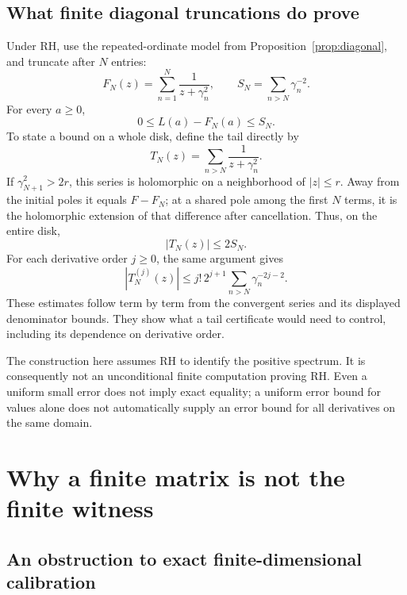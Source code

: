 \documentclass[11pt,a4paper]{article}
\numberwithin{equation}{section}
\theoremstyle{definition}
\theoremstyle{remark}
\begin{document}
\subsection{What finite diagonal truncations do prove}

Under RH, use the repeated-ordinate model from
Proposition~\ref{prop:diagonal}, and truncate after $N$ entries:
\[
F_N(z)=\sum_{n=1}^N\frac1{z+\gamma_n^2},\qquad
S_N=\sum_{n>N}\gamma_n^{-2}.
\]
For every $a\geq0$,
\begin{equation}\label{eq:positive-tail}
0\leq L(a)-F_N(a)\leq S_N.
\end{equation}
To state a bound on a whole disk, define the tail directly by
\[
T_N(z)=\sum_{n>N}\frac1{z+\gamma_n^2}.
\]
If $\gamma_{N+1}^2>2r$, this series is holomorphic on a neighborhood
of $|z|\leq r$. Away from the initial poles it equals $F-F_N$;
at a shared pole among the first $N$ terms, it is the holomorphic
extension of that difference after cancellation. Thus, on the entire disk,
\begin{equation}\label{eq:complex-tail}
|T_N(z)|\leq2S_N.
\end{equation}
For each derivative order $j\geq0$, the same argument gives
\begin{equation}\label{eq:derivative-tail}
|T_N^{(j)}(z)|
\leq j!\,2^{j+1}\sum_{n>N}\gamma_n^{-2j-2}.
\end{equation}
These estimates follow term by term from the convergent series and
its displayed denominator bounds. They show what a tail certificate
would need to control, including its dependence on derivative order.

The construction here assumes RH to identify the positive spectrum.
It is consequently not an unconditional finite computation proving RH.
Even a uniform small error does not imply exact equality; a uniform
error bound for values alone does not automatically supply an error
bound for all derivatives on the same domain.

\section[Finite matrices and witnesses]{Why a finite matrix is not the finite witness}\label{sec:finite}

\subsection{An obstruction to exact finite-dimensional calibration}
\end{document}
